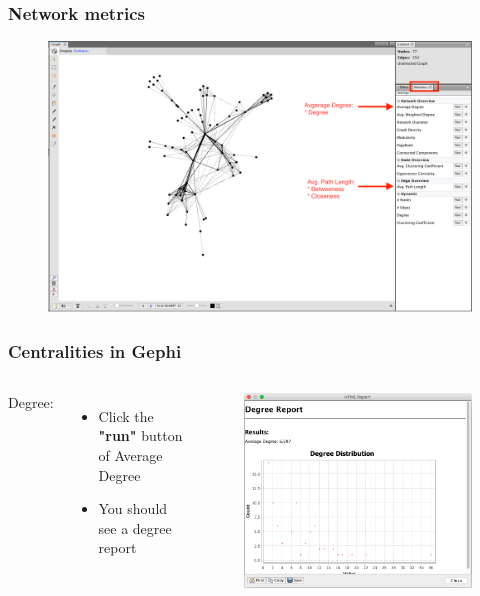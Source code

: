 \documentclass[10pt]{beamer}
\begin{document}
\begin{frame}
\frametitle{Network metrics}
\begin{figure}
\includegraphics[width=0.9\linewidth]{figures/metrics.png}
\end{figure}
\end{frame}

\begin{frame}
\frametitle{Centralities in Gephi}

\begin{columns}[c] 
Degree:
\begin{itemize}
\item Click the \textbf{"run"} button of Average Degree
\item You should see a degree report
\end{itemize}

\begin{figure}
\includegraphics[width=0.9\linewidth]{figures/degree.png}
\end{figure}
\end{columns}
\end{frame}
\end{document}
